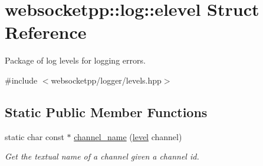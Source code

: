 \hypertarget{structwebsocketpp_1_1log_1_1elevel}{}\section{websocketpp\+:\+:log\+:\+:elevel Struct Reference}
\label{structwebsocketpp_1_1log_1_1elevel}


Package of log levels for logging errors.  




{\ttfamily \#include $<$websocketpp/logger/levels.\+hpp$>$}

\subsection*{Static Public Member Functions}
\begin{DoxyCompactItemize}
\item 
static char const $\ast$ \hyperlink{structwebsocketpp_1_1log_1_1elevel_ac8eb65399a2ea6b782e0265a44618c0e}{channel\+\_\+name} (\hyperlink{namespacewebsocketpp_1_1log_a12d4d17939f102db8c9183d400a41960}{level} channel)
\begin{DoxyCompactList}\small\item\em Get the textual name of a channel given a channel id. \end{DoxyCompactList}\end{DoxyCompactItemize}
